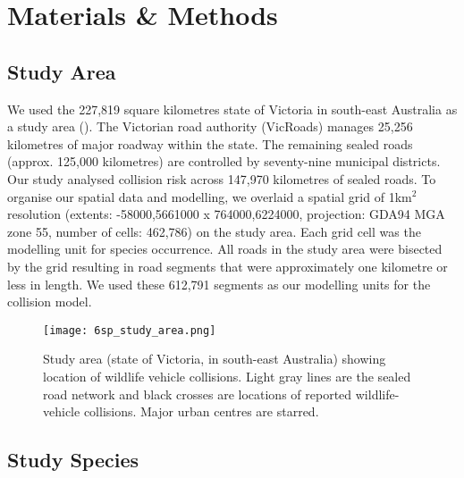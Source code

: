\section{Materials \& Methods}

\subsection{Study Area}

We used the 227,819 square kilometres state of Victoria in south-east Australia as a study area (). The Victorian road authority (VicRoads) manages 25,256 kilometres of major roadway within the state. The remaining sealed roads (approx. 125,000 kilometres) are controlled by seventy-nine municipal districts. Our study analysed collision risk across 147,970 kilometres of sealed roads. To organise our spatial data and modelling, we overlaid a spatial grid of 1km$^2$ resolution (extents: -58000,5661000 x 764000,6224000, projection: GDA94 MGA zone 55, number of cells: 462,786) on the study area. Each grid cell was the modelling unit for species occurrence. All roads in the study area were bisected by the grid resulting in road segments that were approximately one kilometre or less in length. We used these 612,791 segments as our modelling units for the collision model.

\begin{figure*}[htp]
  \centering
  \texttt{[image: 6sp\_study\_area.png]}
  \caption[Wildlife-vehicle collisions in Victoria]{Study area (state of Victoria, in south-east Australia) showing location of wildlife vehicle collisions. Light gray lines are the sealed road network and black crosses are locations of reported wildlife-vehicle collisions. Major urban centres are starred.}
  \label{6sp_study_area}
\end{figure*}

\subsection{Study Species}

